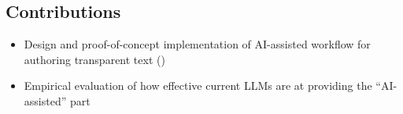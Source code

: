 \subsection{Contributions}

\begin{itemize}
\item Design and proof-of-concept implementation of AI-assisted workflow for authoring transparent text
()
\item Empirical evaluation of how effective current LLMs are at providing the ``AI-assisted'' part
\end{itemize}
